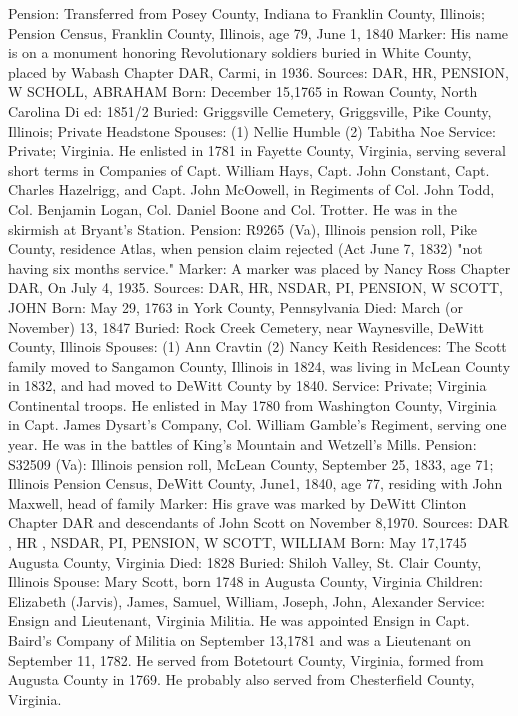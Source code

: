 Pension: Transferred from Posey County, Indiana to Franklin County, Illinois; Pension Census, Franklin County, Illinois, age 79, June 1, 1840 
Marker: His name is on a monument honoring Revolutionary soldiers buried in White County, placed by Wabash Chapter DAR, Carmi, in 1936. 
Sources: DAR, HR, PENSION, W 
SCHOLL, ABRAHAM 
Born: December 15,1765 in Rowan County, North Carolina Di ed: 1851/2
Buried:  Griggsville Cemetery, Griggsville, Pike County, Illinois; Private Head­stone 
Spouses: (1) Nellie Humble
	 (2) Tabitha Noe
Service:  Private; Virginia. He enlisted in 1781 in Fayette County, Virginia, serv­ing several short terms in Companies of Capt. William Hays, Capt. John Constant, Capt. Charles Hazelrigg, and Capt. John McOowell, in Regiments of Col. John Todd, Col. Benjamin Logan, Col. Daniel Boone and Col. Trotter. He was in the skirmish at Bryant's Station. 
Pension: R9265 (Va), Illinois pension roll, Pike County, residence Atlas, when pension claim rejected (Act June 7, 1832) "not having six months service."
Marker: A marker was placed by Nancy Ross Chapter DAR, On July 4, 1935.
Sources: DAR, HR, NSDAR, PI, PENSION, W 
SCOTT, JOHN 
Born: May 29, 1763 in York County, Pennsylvania
Died:   March (or November) 13, 1847
Buried:  Rock Creek Cemetery, near Waynesville, DeWitt County, Illinois 
Spouses: (1) Ann Cravtin 
(2) Nancy Keith 
Residences: The Scott family moved to Sangamon County, Illinois in 1824, was living in McLean County in 1832, and had moved to DeWitt County by 1840. 
Service: Private; Virginia Continental troops. He enlisted in May 1780 from Washington County, Virginia in Capt. James Dysart's Company, Col. William Gamble's Regiment, serving one year. He was in the battles of King's Moun­tain and Wetzell's Mills. 
Pension: S32509 (Va): Illinois pension roll, McLean County, September 25, 1833, age 71; Illinois Pension Census, DeWitt County, June1, 1840, age 77, resid­ing with John Maxwell, head of family 
Marker: His grave was marked by DeWitt Clinton Chapter DAR and descendants of John Scott on November 8,1970. 
Sources: DAR , HR , NSDAR, PI, PENSION, W 
SCOTT, WILLIAM 
Born: May 17,1745 Augusta County, Virginia
Died: 1828
Buried:  Shiloh Valley, St. Clair County, Illinois
Spouse:  Mary Scott, born 1748 in Augusta County, Virginia
Children:  Elizabeth (Jarvis), James, Samuel, William, Joseph, John, Alexander
Service:  Ensign and Lieutenant, Virginia Militia. He was appointed Ensign in Capt. Baird's Company of Militia on September 13,1781 and was a Lieute­nant on September 11, 1782. He served from Botetourt County, Virginia, formed from Augusta County in 1769. He probably also served from Chester­field County, Virginia. 
